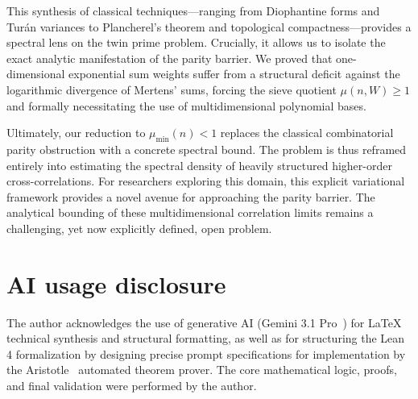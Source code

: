 \documentclass[reqno,notitlepage]{amsart}
\theoremstyle{remark}
\begin{document}
This synthesis of classical techniques---ranging from Diophantine forms and Turán variances to
Plancherel's theorem and topological compactness---provides a spectral lens on the twin prime
problem. Crucially, it allows us to isolate the exact analytic manifestation of the parity barrier.
We proved that one-dimensional exponential sum weights suffer from a structural deficit against the
logarithmic divergence of Mertens' sums, forcing the sieve quotient $\mu(n, W) \ge 1$ and formally
necessitating the use of multidimensional polynomial bases.

Ultimately, our reduction to $\mu_{\min}(n) < 1$ replaces the classical combinatorial parity
obstruction with a concrete spectral bound. The problem is thus reframed entirely into
estimating the spectral density of heavily structured higher-order cross-correlations.
For researchers exploring this domain, this explicit variational framework provides a novel avenue
for approaching the parity barrier. The analytical bounding of these multidimensional correlation
limits remains a challenging, yet now explicitly defined, open problem.

\section*{AI usage disclosure}
The author acknowledges the use of generative AI (Gemini 3.1 Pro~\cite{geminiteam2025}) for LaTeX
technical synthesis and structural formatting, as well as for structuring the Lean 4 formalization
by designing precise prompt specifications for implementation by the Aristotle~\cite{Achim2025}
automated theorem prover. The core mathematical logic, proofs, and final validation were performed
by the author.



\end{document}
